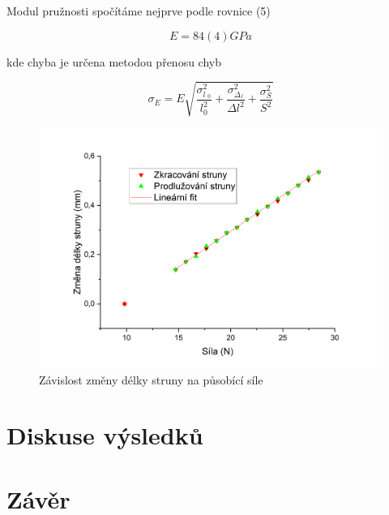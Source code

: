 Modul pružnosti spočítáme nejprve podle rovnice (5)

\begin{equation}
    \nonumber
    E = 84(4) GPa
\end{equation}

kde chyba je určena metodou přenosu chyb

\begin{equation}
    \sigma_E = E \sqrt{\frac{\sigma^2_l__0}{l^2_0}+\frac{\sigma^2_\Delta__l}{\Delta l^2}+\frac{\sigma^2_S}{S^2}}
\end{equation}

\begin{figure}[h]
    \centering
    \includegraphics[width=0.85\linewidth]{09 - Měření modulu pružnosti v tahu//Protokol_modul pružnosti//img/Změna délky struny.png}
    \caption{Závislost změny délky struny na působící síle}
    \label{fig:delka-struny}
\end{figure}

\section{Diskuse výsledků}

\section{Závěr}
